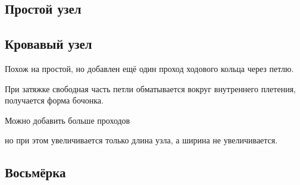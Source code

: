 \subsection{Простой узел}


\subsection{Кровавый узел}

Похож на простой, но добавлен ещё один проход ходового кольца через петлю.


При затяжке свободная часть петли обматывается вокруг внутреннего плетения, получается форма бочонка.


Можно добавить больше проходов


но при этом увеличивается только длина узла, а ширина не увеличивается.

\subsection{Восьмёрка}

